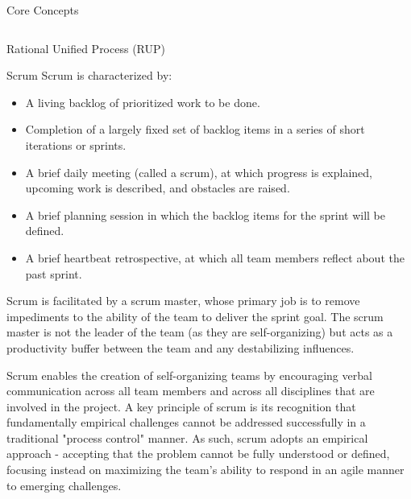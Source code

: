 \documentclass[final,hyperref={pdfpagelabels=false}]{beamer}
\begin{document}
\begin{frame}{Core Concepts}
\begin{columns}[t]
\begin{column}{.48\linewidth}
\begin{block}{Rational Unified Process (RUP) }
\begin{itemize}
            \end{itemize}
            

        \end{block}
        \begin{block}{Scrum}
                Scrum is characterized by:
                \begin{itemize}
                \item A living backlog of prioritized work to be done.
                \item Completion of a largely fixed set of backlog items in a series of short iterations or sprints.
                \item A brief daily meeting (called a scrum), at which progress is explained, upcoming work is described, and obstacles are raised.
                \item A brief planning session in which the backlog items for the sprint will be defined.
                \item A brief heartbeat retrospective, at which all team members reflect about the past sprint.
                \end{itemize}
                Scrum is facilitated by a scrum master, whose primary job is to remove impediments to the ability of the team to deliver the sprint goal. The scrum master is not the leader of the team (as they are self-organizing) but acts as a productivity buffer between the team and any destabilizing influences.
         
                Scrum enables the creation of self-organizing teams by encouraging verbal communication across all team members and across all disciplines that are involved in the project. A key principle of scrum is its recognition that fundamentally empirical challenges cannot be addressed successfully in a traditional "process control" manner. As such, scrum adopts an empirical approach - accepting that the problem cannot be fully understood or defined, focusing instead on maximizing the team's ability to respond in an agile manner to emerging challenges.
        \end{block}
      \end{column}
    \end{columns}
  \end{frame}
  
\end{document}
